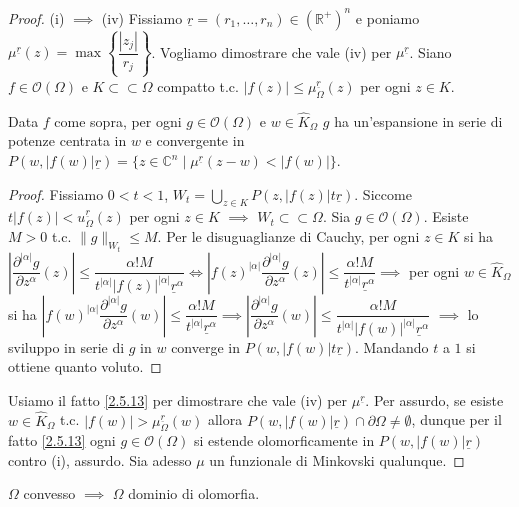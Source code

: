 \begin{proof}
  (i) $\implies$ (iv) Fissiamo $\underline{r}=(r_1,\dots,r_n) \in (\mathbb{R}^+)^n$ e poniamo $\mu^{\underline{r}}(z)=\max\left\{\dfrac{|z_j|}{r_j}\right\}$.
  Vogliamo dimostrare che vale (iv) per $\mu^{\underline{r}}$. Siano $f \in \mathcal{O}(\Omega)$ e $K\subset\subset\Omega$ compatto t.c. $|f(z)| \le \mu_{\Omega}^{\underline{r}}(z)$ per ogni $z \in K$.
  \begin{ftt} \label{2.5.13}
    Data $f$ come sopra, per ogni $g \in \mathcal{O}(\Omega)$ e $w \in \hat{K}_\Omega$ $g$ ha un'espansione in serie di potenze centrata in $w$ e convergente in $P(w, |f(w)|\underline{r})=\{z \in \mathbb{C}^n \mid \mu^{\underline{r}}(z-w)<|f(w)|\}$.
  \end{ftt}
  \begin{proof}
    Fissiamo $0<t<1$, $\displaystyle W_t=\bigcup_{z \in K} P(z, |f(z)|t\underline{r})$. Siccome $t|f(z)|<u_\Omega^{\underline{r}}(z)$ per ogni $z \in K$ $\implies$ $W_t \subset\subset \Omega$. Sia $g \in \mathcal{O}(\Omega)$. Esiste $M>0$ t.c. $\|g\|_{W_t} \le M$.
    Per le disuguaglianze di Cauchy, per ogni $z \in K$ si ha $\left|\dfrac{\partial^{|\alpha|}g}{\partial z^\alpha}(z)\right| \le \dfrac{\alpha!M}{t^{|\alpha|}|f(z)|^{|\alpha|}\underline{r}^\alpha} \iff \left|f(z)^{|\alpha|}\dfrac{\partial^{|\alpha|}g}{\partial z^\alpha}(z)\right| \le \dfrac{\alpha!M}{t^{|\alpha|}\underline{r}^\alpha} \implies$
    per ogni $w \in \hat{K}_\Omega$ si ha $\left|f(w)^{|\alpha|}\dfrac{\partial^{|\alpha|}g}{\partial z^\alpha}(w)\right| \le \dfrac{\alpha!M}{t^{|\alpha|}\underline{r}^\alpha} \implies \left|\dfrac{\partial^{|\alpha|}g}{\partial z^\alpha}(w)\right| \le \dfrac{\alpha!M}{t^{|\alpha|}|f(w)|^{|\alpha|}\underline{r}^\alpha}$ $\implies$
    lo sviluppo in serie di $g$ in $w$ converge in $P(w,|f(w)|t\underline{r})$. Mandando $t$ a $1$ si ottiene quanto voluto.
  \end{proof}
  Usiamo il fatto \ref{2.5.13} per dimostrare che vale (iv) per $\mu^{\underline{r}}$.
  Per assurdo, se esiste $w \in \hat{K}_\Omega$ t.c. $|f(w)|>\mu_\Omega^{\underline{r}}(w)$ allora $P(w,|f(w)|\underline{r}) \cap \partial \Omega \not=\emptyset$, dunque per il fatto \ref{2.5.13} ogni $g \in \mathcal{O}(\Omega)$ si estende olomorficamente in $P(w,|f(w)|\underline{r})$ contro (i), assurdo.
  Sia adesso $\mu$ un funzionale di Minkovski qualunque.
\end{proof}

\begin{cor} \label{conv->dom_olo}
  $\Omega$ convesso $\implies$ $\Omega$ dominio di olomorfia.
\end{cor}

